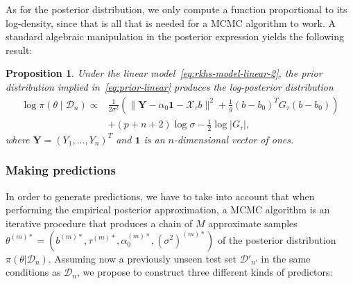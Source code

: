\documentclass{article}
\numberwithin{equation}{section}
\theoremstyle{plain}
\newtheorem{proposition}{Proposition}[section]
\begin{document}
As for the posterior distribution, we only compute a function proportional to its log-density, since that is all that is needed for a MCMC algorithm to work. A standard algebraic manipulation in the posterior expression yields the following result:

\begin{proposition}
  Under the linear model~\eqref{eq:rkhs-model-linear-2}, the prior distribution implied in~\eqref{eq:prior-linear} produces the log-posterior distribution
  \begin{align*}
    \log \pi(\theta \mid \mathcal D_n) \propto {} & \frac{1}{2\sigma^2}\left(\|\bm Y- \alpha_0\bm{1} - \mathcal X_\tau b\|^2 + \frac{1}{g}(b - b_0)^T G_\tau(b - b_0) \right) \\
                                                  & + (p+n+2)\log\sigma - \frac{1}{2}\log |G_\tau|,
  \end{align*}
  where \(\bm Y=(Y_1,\dots,Y_n)^T\) and \(\bm{1}\) is an \(n\)-dimensional vector of ones.
\end{proposition}

\subsubsection*{Making predictions}

In order to generate predictions, we have to take into account that when performing the empirical posterior approximation, a MCMC algorithm is an iterative procedure that produces a chain of \(M\) approximate samples \(\theta^{(m)*}=(b^{(m)*}, \tau^{(m)*}, \alpha_0^{(m)*}, (\sigma^2)^{(m)*})\) of the posterior distribution \(\pi(\theta| \mathcal D_n)\). Assuming now a previously unseen test set \(\mathcal D'_{n'}\) in the same conditions as \(\mathcal D_n\), we propose to construct three different kinds of predictors:
\end{document}
